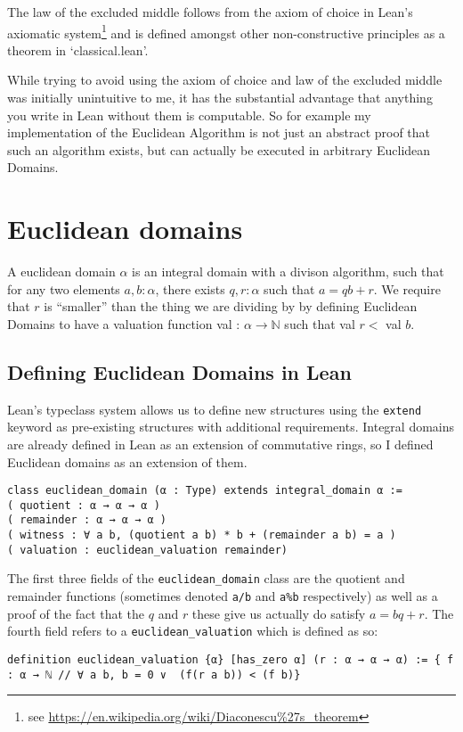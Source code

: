 \documentclass{article}
\newcommand{\N}{\ensuremath{\mathbb{N}}}
\renewcommand{\a}{\alpha}
\newcommand{\ct}{\texttt}
\begin{document}
The law of the excluded middle follows from the axiom of choice in Lean's axiomatic system\footnote{see \url{https://en.wikipedia.org/wiki/Diaconescu\%27s\_theorem}} and is defined amongst other non-constructive principles as a theorem in `classical.lean'. 

While trying to avoid using the axiom of choice and law of the excluded middle was initially unintuitive to me, it has the substantial advantage that anything you write in Lean without them is computable.
So for example my implementation of the Euclidean Algorithm is not just an abstract proof that such an algorithm exists, but can actually be executed in arbitrary Euclidean Domains.

\section{Euclidean domains}
A euclidean domain $\a$ is an integral domain with a divison algorithm, such that for any two elements $a,b :\a$, there exists $q,r : \a$ such that $a=qb+r$.
We require that $r$ is ``smaller'' than the thing we are dividing by by defining Euclidean Domains to have a valuation function val : $\a \to \N$ such that val $r < $ val $b$.

\subsection{Defining Euclidean Domains in Lean}
Lean's typeclass system allows us to define new structures using the \ct{extend} keyword as pre-existing structures with additional requirements.
Integral domains are already defined in Lean as an extension of commutative rings, so I defined Euclidean domains as an extension of them.
\begin{lstlisting}
class euclidean_domain (α : Type) extends integral_domain α :=
( quotient : α → α → α )
( remainder : α → α → α )
( witness : ∀ a b, (quotient a b) * b + (remainder a b) = a )
( valuation : euclidean_valuation remainder)
\end{lstlisting}

The first three fields of the \ct{euclidean\_domain} class are the quotient and remainder functions (sometimes denoted \ct{a/b} and \ct{a\%b} respectively) as well as a proof of the fact that the $q$ and $r$ these give us actually do satisfy $a=bq+r$. The fourth field refers to a \ct{euclidean\_valuation} which is defined as so:
\begin{lstlisting}
definition euclidean_valuation {α} [has_zero α] (r : α → α → α) := { f : α → ℕ // ∀ a b, b = 0 ∨  (f(r a b)) < (f b)}
\end{lstlisting}
\end{document}
